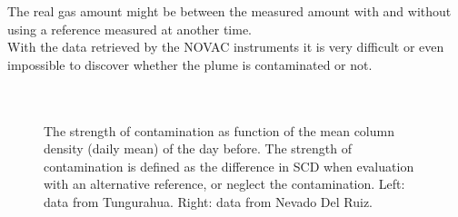 The real gas amount might be between the measured amount with and without using a reference measured at another time.\\
%
With the data retrieved by the NOVAC instruments it is very difficult or even impossible to discover whether the plume is contaminated or not. \\
\\
\\
\begin{figure}
	\caption[The strength of contamination as function of the mean  column density (daily mean) of the day before. Data from Tungurahua and Nevado Del Ruiz.]{The strength of contamination as function of the mean  column density (daily mean) of the day before. The strength of contamination is defined as the difference in  SCD  when evaluation with an alternative reference, or neglect the contamination. Left: data from Tungurahua. Right: data from Nevado Del Ruiz. }
	\label{fig:contaminationdependencyso2}
\end{figure}

